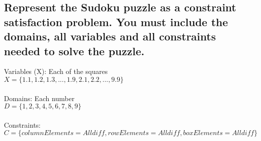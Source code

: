 \documentclass[11pt]{article}
\begin{document}
\subsection{Represent the Sudoku puzzle as a constraint satisfaction problem. You
must include the domains, all variables and all constraints needed to
solve the puzzle.}
Variables (X): Each of the squares\\
$X = \{1.1, 1.2, 1.3, ..., 1.9, 2.1, 2.2, ..., 9.9\}$\\
\\
Domains: Each number\\
$D = \{1, 2, 3, 4, 5, 6, 7, 8, 9\}$\\
\\
Constraints: \\
$C = \{ column Elements = \textit{Alldiff}, rowElements = \textit{Alldiff}, boxElements = \textit{Alldiff} \}$
\end{document}
